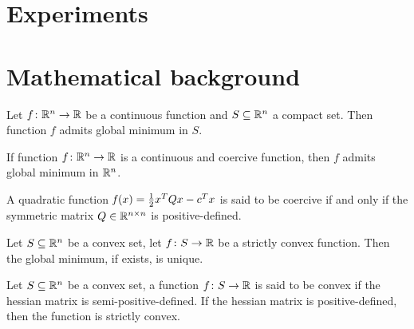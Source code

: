 
\section{Experiments}

\cleardoublepage
\section{Mathematical background}

\begin{thm}\label{thm:weirs}
Let $f\colon\mathbb{R}^n\to\mathbb{R}$ be a continuous function and $S\subseteq\mathbb{R}^n$ a compact set. Then function $f$ admits global minimum in $S$.
\end{thm}

\begin{cor}
If function $f\colon\mathbb{R}^n\to\mathbb{R}$ is a continuous and coercive function, then $f$ admits global minimum in $\mathbb{R}^n$.
\end{cor}

\begin{prop}
A quadratic function $\operatorname*{\mathit{f}}(x)=\frac{1}{2}x^TQx-c^Tx$ is said to be coercive if and only if the symmetric matrix $Q\in\mathbb{R}^{n\times n}$ is positive-defined.
\end{prop}

\begin{prop}
Let $S\subseteq\mathbb{R}^n$ be a convex set, let $f\colon S\to\mathbb{R}$ be a strictly convex function. Then the global minimum, if exists, is unique.
\end{prop}

\begin{defs}
Let $S\subseteq\mathbb{R}^n$ be a convex set, a function $f\colon S\to\mathbb{R}$ is said to be convex if the hessian matrix is semi-positive-defined. If the hessian matrix is positive-defined, then the function is strictly convex.
\end{defs}









